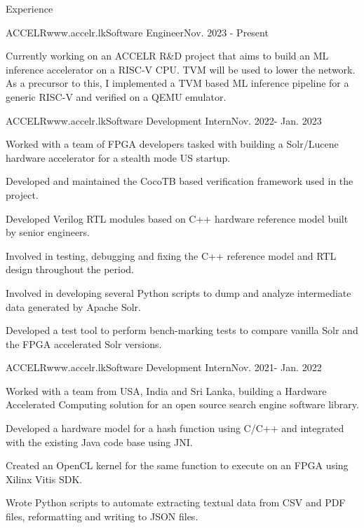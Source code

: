 \documentclass[
	11pt, %
]{./../assets/resume} %
\begin{document}
\begin{rSection}{Experience}

	\begin{rSubsectionX}{ACCELR}{www.accelr.lk}{Software Engineer}{Nov. 2023 - Present}
		\item Currently working on an ACCELR R\&D project that aims to build an ML inference accelerator on a RISC-V CPU. TVM will be used to lower the network. As a precursor to this, I implemented a TVM based ML inference pipeline for a generic RISC-V and verified on a QEMU emulator.
	\end{rSubsectionX}

	\begin{rSubsectionX}{ACCELR}{www.accelr.lk}{Software Development Intern}{Nov. 2022- Jan. 2023}
            \item Worked with a team of FPGA developers tasked with building a Solr/Lucene hardware accelerator for a stealth mode US startup.
            \item Developed and maintained the CocoTB based verification framework used in the project. \ \item Developed Verilog RTL modules based on C++ hardware reference model built by senior engineers.
            \item Involved in testing, debugging and fixing the C++ reference model and RTL design throughout the period.
            \item Involved in developing several Python scripts to dump and analyze intermediate data generated by Apache Solr.
            \item Developed a test tool to perform bench-marking tests to compare vanilla Solr and the FPGA accelerated Solr versions.
	\end{rSubsectionX}

	\begin{rSubsectionX}{ACCELR}{www.accelr.lk}{Software Development Intern}{Nov. 2021- Jan. 2022}
            \item Worked with a team from USA, India and Sri Lanka, building a Hardware Accelerated Computing solution for an open source search engine software library.
            \item Developed a hardware model for a hash function using C/C++ and integrated with the existing Java code base using JNI.
            \item Created an OpenCL kernel for the same function to execute on an FPGA using Xilinx Vitis SDK.
            \item Wrote Python scripts to automate extracting textual data from CSV and PDF files, reformatting and writing to JSON files.

	\end{rSubsectionX}

\end{rSection}
\end{document}
